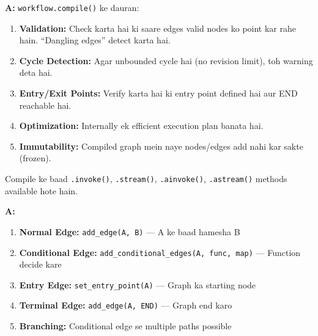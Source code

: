 \documentclass[12pt, a4paper]{article}
\begin{document}
\begin{interviewbox}[title={\faIcon{user-tie} ~Q13: \texttt{compile()} kya karta hai internally?}]
\textbf{A:} \texttt{workflow.compile()} ke dauran:
\begin{enumerate}
\item \textbf{Validation:} Check karta hai ki saare edges valid nodes ko point kar rahe hain. ``Dangling edges'' detect karta hai.
\item \textbf{Cycle Detection:} Agar unbounded cycle hai (no revision limit), toh warning deta hai.
\item \textbf{Entry/Exit Points:} Verify karta hai ki entry point defined hai aur END reachable hai.
\item \textbf{Optimization:} Internally ek efficient execution plan banata hai.
\item \textbf{Immutability:} Compiled graph mein naye nodes/edges add nahi kar sakte (frozen).
\end{enumerate}

Compile ke baad \texttt{.invoke()}, \texttt{.stream()}, \texttt{.ainvoke()}, \texttt{.astream()} methods available hote hain.
\end{interviewbox}

\begin{interviewbox}[title={\faIcon{user-tie} ~Q14: Conditional edges ke alawa aur kaunse edge types hain LangGraph mein?}]
\textbf{A:}
\begin{enumerate}
\item \textbf{Normal Edge:} \texttt{add\_edge(A, B)} --- A ke baad hamesha B
\item \textbf{Conditional Edge:} \texttt{add\_conditional\_edges(A, func, map)} --- Function decide kare
\item \textbf{Entry Edge:} \texttt{set\_entry\_point(A)} --- Graph ka starting node
\item \textbf{Terminal Edge:} \texttt{add\_edge(A, END)} --- Graph end karo
\item \textbf{Branching:} Conditional edge se multiple paths possible
\end{enumerate}
\end{interviewbox}
\end{document}
